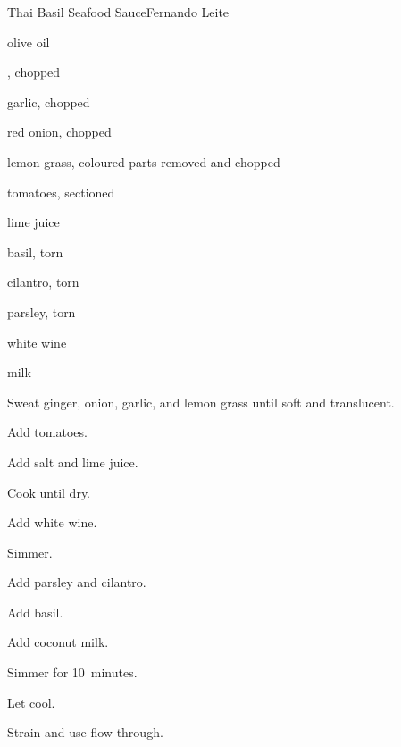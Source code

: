 \begin{recipe}{Thai Basil Seafood Sauce}{Fernando Leite}{}

\begin{ingredients}
\item olive oil
\item {}, chopped
\item garlic, chopped
\item red onion, chopped
\item lemon grass, coloured parts removed and chopped
\item tomatoes, sectioned
\item lime juice
\item {} basil, torn
\item \C{\half} cilantro, torn
\item \C{\half} parsley, torn
\item \C{\quarter} white wine
\item \C{\half}  milk
\end{ingredients}

\begin{directions}
\item Sweat ginger, onion, garlic, and lemon grass until soft and translucent.
\item Add tomatoes.
\item Add salt and lime juice.
\item Cook until dry.
\item Add white wine.
\item Simmer.
\item Add parsley and cilantro.
\item Add basil.
\item Add coconut milk.
\item Simmer for 10~minutes.
\item Let cool.
\item Strain and use flow-through.
\end{directions}

\end{recipe}
